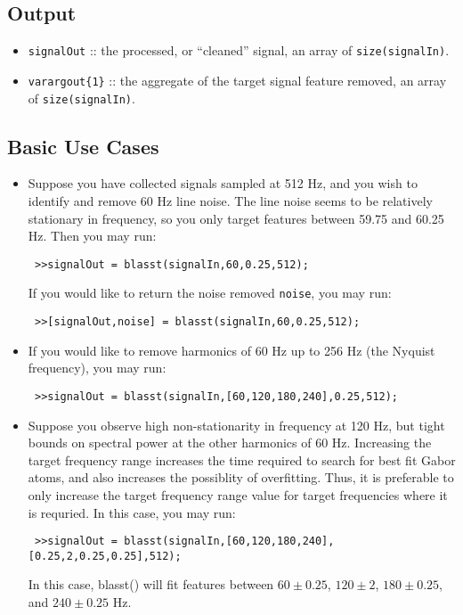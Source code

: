 \documentclass[11pt]{article}
\theoremstyle{remark}
\begin{document}
\begin{itemize}
\begin{itemize}
\end{itemize}

\end{itemize}

\subsection{Output}
\begin{itemize}

\item  \verb!signalOut! :: the processed, or ``cleaned'' signal, an array of \verb~size(signalIn)~.
\item \verb!varargout{1}! :: the aggregate of the target signal feature removed, an array of \verb!size(signalIn)!.

\end{itemize}

\subsection{Basic Use Cases}

\begin{itemize}
\item Suppose you have collected signals sampled at 512 Hz, and you wish to identify and remove 60 Hz line noise. The line noise seems to be relatively stationary in frequency, so you only target features between 59.75 and 60.25 Hz. Then you may run:

\verb~ >>signalOut = blasst(signalIn,60,0.25,512);~

If you would like to return the noise removed \verb~noise~, you may run:

\verb~ >>[signalOut,noise] = blasst(signalIn,60,0.25,512);~

\item If you would like to remove harmonics of 60 Hz up to 256 Hz (the Nyquist frequency), you may run:

\verb~ >>signalOut = blasst(signalIn,[60,120,180,240],0.25,512);~

\item Suppose you observe high non-stationarity in frequency at 120 Hz, but tight bounds on spectral power at the other harmonics of 60 Hz. Increasing the target frequency range increases the time required to search for best fit Gabor atoms, and also increases the possiblity of overfitting. Thus, it is preferable to only increase the target frequency range value for target frequencies where it is requried. In this case, you may run:

\verb~ >>signalOut = blasst(signalIn,[60,120,180,240],[0.25,2,0.25,0.25],512);~

In this case, blasst() will fit features between $60\pm 0.25$, $120 \pm 2$, $180\pm 0.25$, and $240\pm 0.25$ Hz.

\end{itemize}
\end{document}

